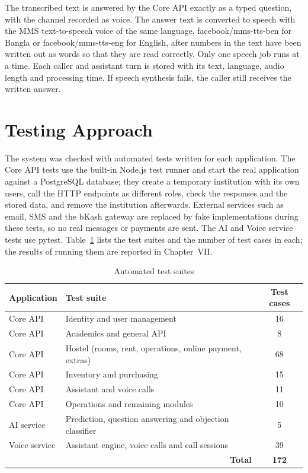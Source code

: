 The transcribed text is answered by the Core API exactly as a typed question, with the channel recorded as voice. The answer text is converted to speech with the MMS text-to-speech voice of the same language, facebook/mms-tts-ben for Bangla or facebook/mms-tts-eng for English, after numbers in the text have been written out as words so that they are read correctly. Only one speech job runs at a time. Each caller and assistant turn is stored with its text, language, audio length and processing time. If speech synthesis fails, the caller still receives the written answer.

\section{Testing Approach}
The system was checked with automated tests written for each application. The Core API tests use the built-in Node.js test runner and start the real application against a PostgreSQL database; they create a temporary institution with its own users, call the HTTP endpoints as different roles, check the responses and the stored data, and remove the institution afterwards. External services such as email, SMS and the bKash gateway are replaced by fake implementations during these tests, so no real messages or payments are sent. The AI and Voice service tests use pytest. Table~\ref{tab:tests} lists the test suites and the number of test cases in each; the results of running them are reported in Chapter~VII.

\begin{table}[H]
    \centering
        \caption{Automated test suites}
        \label{tab:tests}
        \begin{tabular}{|p{3.2cm}|p{5.4cm}|c|}
        \hline
        \textbf{Application} & \textbf{Test suite} & \textbf{Test cases}\\
        \hline
        Core API & Identity and user management & 16 \\
        \hline
        Core API & Academics and general API & 8 \\
        \hline
        Core API & Hostel (rooms, rent, operations, online payment, extras) & 68 \\
        \hline
        Core API & Inventory and purchasing & 15 \\
        \hline
        Core API & Assistant and voice calls & 11 \\
        \hline
        Core API & Operations and remaining modules & 10 \\
        \hline
        AI service & Prediction, question answering and objection classifier & 5 \\
        \hline
        Voice service & Assistant engine, voice calls and call sessions & 39 \\
        \hline
        \multicolumn{2}{|r|}{\textbf{Total}} & \textbf{172} \\
        \hline
        \end{tabular}
\end{table}

